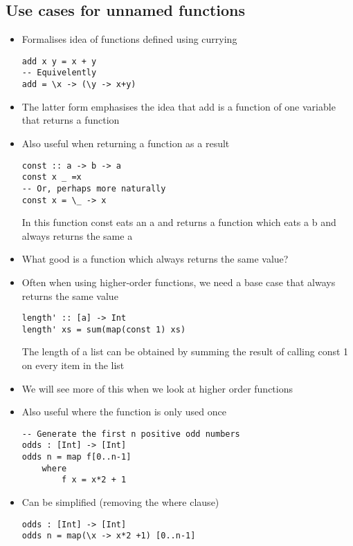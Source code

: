 \documentclass{article}[18pt]
\begin{document}
\subsection{Use cases  for unnamed functions}
\begin{itemize}
	\item Formalises idea of functions defined using currying
\begin{verbatim}
add x y = x + y
-- Equivelently
add = \x -> (\y -> x+y)
\end{verbatim}
	\item The latter form emphasises the idea that add is a function of one variable that returns a function
	\item Also useful when returning a function as a result
\begin{verbatim}
const :: a -> b -> a
const x _ =x
-- Or, perhaps more naturally
const x = \_ -> x
\end{verbatim}
In this function const eats an a and returns a function which eats a b and always returns the same a
	\item What good is a function which always returns the same value?
	\item Often when using higher-order functions, we need a base case that always returns the same value
\begin{verbatim}
length' :: [a] -> Int
length' xs = sum(map(const 1) xs)
\end{verbatim}
The length of a list can be obtained by summing the result of calling const 1 on every item in the list
	\item We will see more of this when we look at higher order functions
	\item Also useful where the function is only used once
\begin{verbatim}
-- Generate the first n positive odd numbers
odds : [Int] -> [Int]
odds n = map f[0..n-1]
	where
		f x = x*2 + 1
\end{verbatim}
	\item Can be simplified (removing the where clause)
\begin{verbatim}
odds : [Int] -> [Int]
odds n = map(\x -> x*2 +1) [0..n-1]
\end{verbatim}
\end{itemize}
\end{document}
